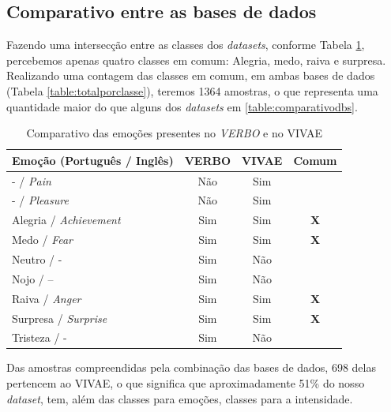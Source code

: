 \subsection{Comparativo entre as bases de dados}

Fazendo uma intersecção entre as classes dos \textit{datasets}, conforme Tabela \ref{table:verbovsvivae}, percebemos apenas quatro classes em comum: Alegria, medo, raiva e surpresa. Realizando uma contagem das classes em comum, em ambas bases de dados (Tabela \ref{table:totalporclasse}), teremos 1364 amostras, o que representa uma quantidade maior do que alguns dos \textit{datasets} em \ref{table:comparativodbs}.

\begin{table}[]
\centering
\caption{Comparativo das emoções presentes no \textit{VERBO} e no \acrshort{VIVAE}}
    \begin{tabular}{|l|c|c|c|}
    \hline
        Emoção (Português / Inglês) & VERBO & VIVAE & Comum  \\ \hline
        - / \textit{Pain} & Não & Sim &    \\ \hline
        - / \textit{Pleasure} & Não & Sim &    \\ \hline
        Alegria / \textit{Achievement} & Sim & Sim & \textbf{X}  \\ \hline
        Medo / \textit{Fear} & Sim & Sim & \textbf{X}  \\ \hline
        Neutro / - & Sim & Não &    \\ \hline
        Nojo / – & Sim & Não &    \\ \hline
        Raiva / \textit{Anger} & Sim & Sim & \textbf{X}  \\ \hline
        Surpresa / \textit{Surprise} & Sim & Sim & \textbf{X}  \\ \hline
        Tristeza / - & Sim & Não &    \\ \hline
    \end{tabular}\label{table:verbovsvivae}
\end{table}

Das amostras compreendidas pela combinação das bases de dados, 698 delas pertencem ao \acrshort{VIVAE}, o que significa que aproximadamente 51\% do nosso \textit{dataset}, tem, além das classes para emoções, classes para a intensidade.


